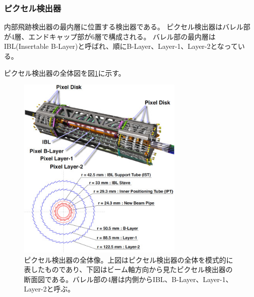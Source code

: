 \subsubsection{ピクセル検出器}

内部飛跡検出器の最内層に位置する検出器である。
ピクセル検出器はバレル部が4層、エンドキャップ部が6層で構成される。
バレル部の最内層はIBL(Insertable B-Layer)と呼ばれ、順にB-Layer、Layer-1、Layer-2となっている。

ピクセル検出器の全体図を図\ref{pixel_detector_overview}に示す。
\begin{figure}[bpt]\centering
\includegraphics[width=8cm]{./pixel_detector_overview.jpg}
\caption[ピクセル検出器の全体像]{ピクセル検出器の全体像\cite{1-5}。上図はピクセル検出器の全体を模式的に表したものであり、下図はビーム軸方向から見たピクセル検出器の断面図である。バレル部の4層は内側からIBL、B-Layer、Layer-1、Layer-2と呼ぶ。}
\label{pixel_detector_overview}
\end{figure}

